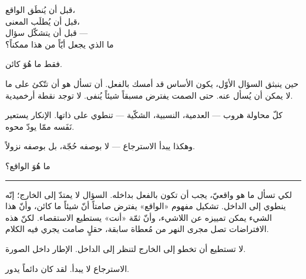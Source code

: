 \documentclass[10pt, openany, oneside]{book}
\begin{document}

\noindent قبل أن يُنطَق الواقع،\\
قبل أن يُطلَب المعنى،\\
قبل أن يتشكّل سؤال ---\\
ما الذي يجعل أيّاً من هذا ممكناً؟

\vspace{0.5em}

فقط ما هُوَ كائن.

\vspace{1em}

\noindent حين ينبثق السؤال الأوّل، يكون الأساس قد أمسك بالفعل. أن تسأل هو أن تتّكئ على ما لا يمكن أن يُسأل عنه. حتى الصمت يفترض مسبقاً شيئاً يُنفى. لا توجد نقطة أرخميدية.

\vspace{0.5em}

\noindent كلّ محاولة هروب --- العدمية، النسبية، الشكّية --- تنطوي على ذاتها. الإنكار يستعير نَفَسه ممّا يودّ محوه.

\vspace{0.5em}

\noindent وهكذا يبدأ الاسترجاع --- لا بوصفه حُجّة، بل بوصفه نزولاً.

\vspace{2em}

\begin{center}
    {\scshape ما هُوَ الواقع؟}\\[0.3em]
    \rule{0.2\textwidth}{0.3pt}
\end{center}

\vspace{1em}

\noindent لكي تسأل ما هو واقعيّ، يجب أن تكون بالفعل بداخله. السؤال لا يمتدّ إلى الخارج؛ إنّه ينطوي إلى الداخل. تشكيل مفهوم «الواقع» يفترض صامتاً أنّ شيئاً ما كائن، وأنّ هذا الشيء يمكن تمييزه عن اللاشيء، وأنّ ثمّة «أنت» يستطيع الاستقصاء. لكنّ هذه الافتراضات تصل مجرى النهر من مُعطاة سابقة، حقلٍ صامت يجري فيه الكلام.

\vspace{0.5em}

\noindent لا تستطيع أن تخطو إلى الخارج لتنظر إلى الداخل. الإطار داخل الصورة.

\vspace{0.5em}

\noindent الاسترجاع لا يبدأ. لقد كان دائماً يدور.

\vspace{2em}
\end{document}

